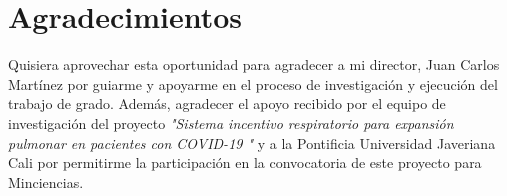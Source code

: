 \documentclass[12pt]{article}
\begin{document}


%


%





\clearpage\null\newpage








\clearpage\null\newpage







\section*{Agradecimientos}

Quisiera aprovechar esta oportunidad para agradecer a mi director, Juan Carlos Martínez por guiarme y apoyarme en el proceso de investigación y ejecución del trabajo de grado. Además, agradecer el apoyo recibido por el equipo de investigación del proyecto \textit{"Sistema incentivo respiratorio para expansión pulmonar en pacientes con COVID-19 "} y a la Pontificia Universidad Javeriana Cali por permitirme la participación en la convocatoria de este proyecto para Minciencias.




\newpage


\end{document}
